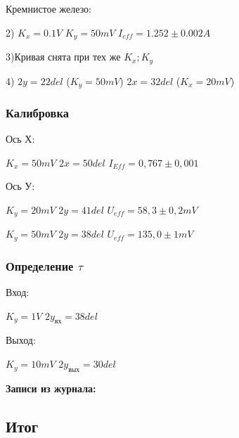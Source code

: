 \documentclass[a4paper,12pt]{article}
\begin{document}
Кремнистое железо:

2)
$K_x = 0.1V$
$K_y = 50mV$
$I_{eff} = 1.252 \pm 0.002 A$

3)Кривая снята при тех же $K_x; K_y$

4)
$2y = 22 del$
($K_y = 50mV$)
$2x = 32 del$
($K_x = 20 mV$)


\subsubsection*{Калибровка}

Ось Х:

$K_x = 50mV$
$2x = 50 del$
$I_{Eff} = 0,767 \pm 0,001$

Ось У:

$K_y  =20 mV$
$2y = 41 del$
$U_{eff} = 58,3 \pm 0,2 mV$

$K_y  = 50 mV$
$2y = 38 del$
$U_{eff} = 135,0 \pm 1 mV$

\subsubsection*{Определение $\tau$}



Вход:

$K_y = 1V$
$2y_\text{вх} = 38 del$

Выход:

$K_y = 10mV$
$2y_\text{вых} = 30 del$

\bigskip

\textbf{Записи из журнала:}
\bigskip


\bigskip

\subsection*{Итог}
\bigskip
 
\end{document}
